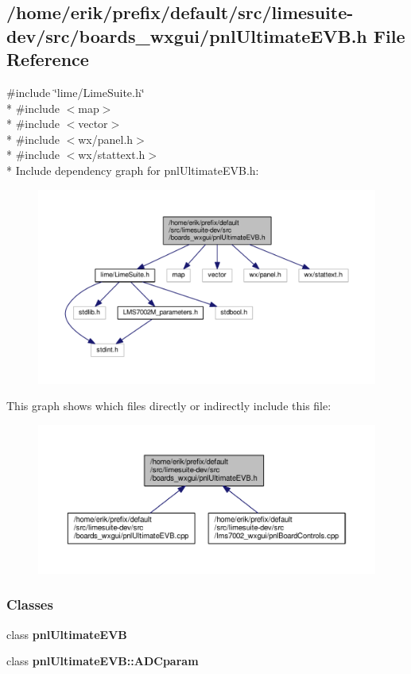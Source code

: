 \subsection{/home/erik/prefix/default/src/limesuite-\/dev/src/boards\+\_\+wxgui/pnl\+Ultimate\+E\+VB.h File Reference}
\label{pnlUltimateEVB_8h}
{\ttfamily \#include \char`\"{}lime/\+Lime\+Suite.\+h\char`\"{}}\\*
{\ttfamily \#include $<$map$>$}\\*
{\ttfamily \#include $<$vector$>$}\\*
{\ttfamily \#include $<$wx/panel.\+h$>$}\\*
{\ttfamily \#include $<$wx/stattext.\+h$>$}\\*
Include dependency graph for pnl\+Ultimate\+E\+V\+B.\+h\+:
\nopagebreak
\begin{figure}[H]
\begin{center}
\leavevmode
\includegraphics[width=350pt]{d7/d3b/pnlUltimateEVB_8h__incl}
\end{center}
\end{figure}
This graph shows which files directly or indirectly include this file\+:
\nopagebreak
\begin{figure}[H]
\begin{center}
\leavevmode
\includegraphics[width=350pt]{dc/d75/pnlUltimateEVB_8h__dep__incl}
\end{center}
\end{figure}
\subsubsection*{Classes}
\begin{DoxyCompactItemize}
\item 
class {\bf pnl\+Ultimate\+E\+VB}
\item 
class {\bf pnl\+Ultimate\+E\+V\+B\+::\+A\+D\+Cparam}
\end{DoxyCompactItemize}

